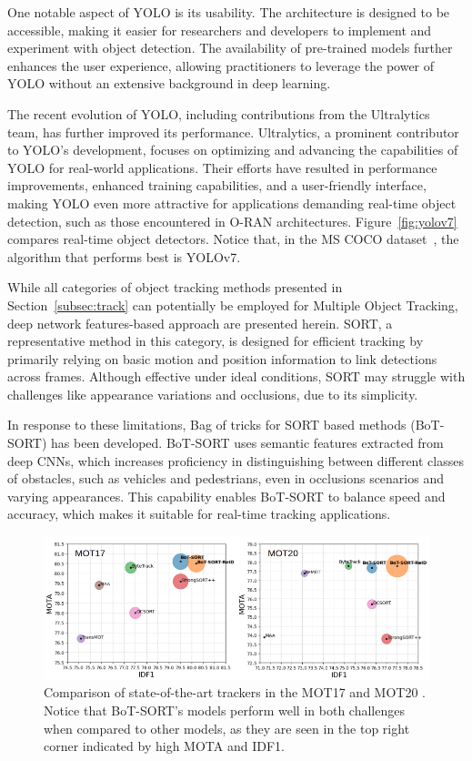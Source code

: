 One notable aspect of YOLO is its usability.
The architecture is designed to be accessible, making it easier for researchers and developers to implement and experiment with object detection.
The availability of pre-trained models further enhances the user experience, allowing practitioners to leverage the power of YOLO without an extensive background in deep learning.

The recent evolution of YOLO, including contributions from the Ultralytics~\cite{ultralytics_docs} team, has further improved its performance.
Ultralytics, a prominent contributor to YOLO's development, focuses on optimizing and advancing the capabilities of YOLO for real-world applications.
Their efforts have resulted in performance improvements, enhanced training capabilities, and a user-friendly interface, making YOLO even more attractive for applications demanding real-time object detection, such as those encountered in O-RAN architectures.
Figure~\ref{fig:yolov7} compares real-time object detectors.
Notice that, in the MS COCO dataset~\cite{COCO}, the algorithm that performs best is YOLOv7.

While all categories of object tracking methods presented in Section~\ref{subsec:track} can potentially be employed for Multiple Object Tracking, deep network features-based approach are presented herein.
SORT, a representative method in this category, is designed for efficient tracking by primarily relying on basic motion and position information to link detections across frames.
Although effective under ideal conditions, SORT may struggle with challenges like appearance variations and occlusions, due to its simplicity.

In response to these limitations, Bag of tricks for SORT based methods (BoT-SORT)\cite{botsort} has been developed.
BoT-SORT uses semantic features extracted from deep CNNs, which increases proficiency in distinguishing between different classes of obstacles, such as vehicles and pedestrians, even in occlusions scenarios and varying appearances.
This capability enables BoT-SORT to balance speed and accuracy, which makes it suitable for real-time tracking applications.


\begin{figure}[H]
    \centering
    \includegraphics[width=0.8\linewidth]{figures/botsort}
    \caption[Comparison of state-of-the-art trackers in the MOT17 and MOT20]{ Comparison of state-of-the-art trackers in the MOT17 and MOT20 \cite{botsort}. Notice that BoT-SORT's models perform well in both challenges when compared to other models, as they are seen in the top right corner indicated by high MOTA and IDF1.}
    \label{fig:botsort}
\end{figure}

